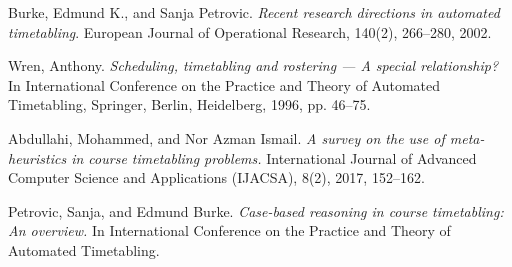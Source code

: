 \documentclass[12pt]{article}
\begin{document}
      
\begin{thebibliography}{9}


Burke, Edmund K., and Sanja Petrovic.
\textit{Recent research directions in automated timetabling}.
European Journal of Operational Research, 140(2), 266–280, 2002.

Wren, Anthony.
\textit{Scheduling, timetabling and rostering — A special relationship?} 
In International Conference on the Practice and Theory of Automated Timetabling, Springer, Berlin, Heidelberg, 1996, pp. 46–75.

Abdullahi, Mohammed, and Nor Azman Ismail.
\textit{A survey on the use of meta-heuristics in course timetabling problems.}
International Journal of Advanced Computer Science and Applications (IJACSA), 8(2), 2017, 152–162.

Petrovic, Sanja, and Edmund Burke.
\textit{Case-based reasoning in course timetabling: An overview.}
In International Conference on the Practice and Theory of Automated Timetabling.


\end{thebibliography}
\end{document}
